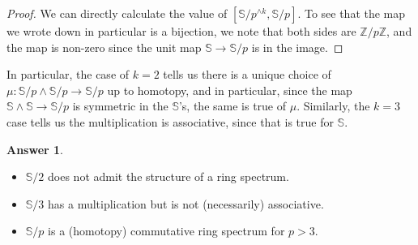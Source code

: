 \documentclass{shortart}
\theoremstyle{definition}
\newtheorem*{ans}{Answer}
\newcommand\Sph{\mathbb{S}}
\newcommand\Z{\mathbb{Z}}
\begin{document}
\begin{proof}
  We can directly calculate the value of $[\Sph/p^{\wedge k}, \Sph/p]$. To see that the map we wrote down in particular is a bijection, we note that both sides are $\Z/p\Z$, and the map is non-zero since the unit map $\Sph \to \Sph/p$ is in the image.
\end{proof}
In particular, the case of $k = 2$ tells us there is a unique choice of $\mu: \Sph/p \wedge \Sph/p \to \Sph/p$ up to homotopy, and in particular, since the map $\Sph \wedge \Sph \to \Sph/p$ is symmetric in the $\Sph$'s, the same is true of $\mu$. Similarly, the $k = 3$ case tells us the multiplication is associative, since that is true for $\Sph$.

\begin{ans}\leavevmode
  \begin{itemize}
    \item $\Sph/2$ does not admit the structure of a ring spectrum.
    \item $\Sph/3$ has a multiplication but is not (necessarily) associative.
    \item $\Sph/p$ is a (homotopy) commutative ring spectrum for $p > 3$.
  \end{itemize}
\end{ans}
\end{document}

